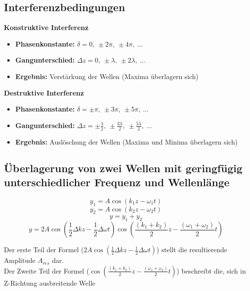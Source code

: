 \documentclass[a4paper,10pt]{article}
\newenvironment{displayformula}
{
	\begin{framed}
		\color{formulaColor}
	}
	{\end{framed}}
\begin{document}
\subsection{Interferenzbedingungen}

\textbf{Konstruktive Interferenz}

\begin{itemize}
	\item \textbf{Phasenkonstante:} $\delta = 0,\ \pm 2\pi,\ \pm 4\pi,\ \dots$
	\item \textbf{Gangunterschied:} $\Delta z = 0,\ \pm \lambda,\ \pm 2\lambda,\ \dots$
	\item \textbf{Ergebnis:} Verstärkung der Wellen (Maxima überlagern sich)
\end{itemize}

\vspace{1ex}

\textbf{Destruktive Interferenz}

\begin{itemize}
	\item \textbf{Phasenkonstante:} $\delta = \pm \pi,\ \pm 3\pi,\ \pm 5\pi,\ \dots$
	\item \textbf{Gangunterschied:} $\Delta z = \pm \frac{\lambda}{2},\ \pm \frac{3\lambda}{2},\ \pm \frac{5\lambda}{2},\ \dots$
	\item \textbf{Ergebnis:} Auslöschung der Wellen (Maxima und Minima überlagern sich)
\end{itemize}

\subsection{Überlagerung von zwei Wellen mit geringfügig unterschiedlicher Frequenz und Wellenlänge}

\begin{displayformula}
	\[
	y_1 = A \cos (k_1z - \omega_1 t)
	\]
	\[
	y_2 = A \cos (k_2z - \omega_2 t)
	\]
	\[
	y = y_1 + y_2
	\]
	\[
	y = 2 A \cos (\frac{1}{2} \Delta kz - \frac{1}{2} \Delta \omega t) \cos (\frac{(k_1 + k_2)}{2} z - \frac{(\omega_1 + \omega_2)}{2}t)
	\]
\end{displayformula}
Der erste Teil der Formel ($2 A \cos (\frac{1}{2} \Delta kz - \frac{1}{2} \Delta \omega t)$) stellt die resultierende Amplitude $A_{res}$ dar. \\
Der Zweite Teil der Formel ($\cos (\frac{(k_1 + k_2)}{2} z - \frac{(\omega_1 + \omega_2)}{2}t)$) beschreibt die, sich in Z-Richtung ausbreitende Welle
\end{document}
